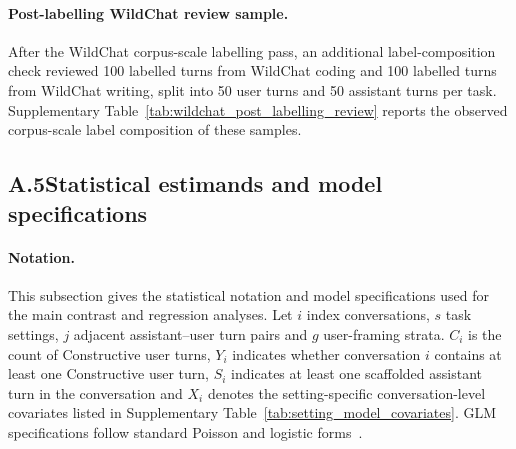 \paragraph{Post-labelling WildChat review sample.}
After the WildChat corpus-scale labelling pass, an additional label-composition check reviewed 100 labelled turns from WildChat coding and 100 labelled turns from WildChat writing, split into 50 user turns and 50 assistant turns per task. Supplementary Table~\ref{tab:wildchat_post_labelling_review} reports the observed corpus-scale label composition of these samples.

\clearpage

\subsection*{A.5\quad Statistical estimands and model specifications}
\label{supp:a5}

\paragraph{Notation.}
This subsection gives the statistical notation and model specifications used for the main contrast and regression analyses. Let $i$ index conversations, $s$ task settings, $j$ adjacent assistant--user turn pairs and $g$ user-framing strata. $C_i$ is the count of Constructive user turns, $Y_i$ indicates whether conversation $i$ contains at least one Constructive user turn, $S_i$ indicates at least one scaffolded assistant turn in the conversation and $X_i$ denotes the setting-specific conversation-level covariates listed in Supplementary Table~\ref{tab:setting_model_covariates}. GLM specifications follow standard Poisson and logistic forms~\cite{mccullagh1989generalized,agresti2013categorical}.

